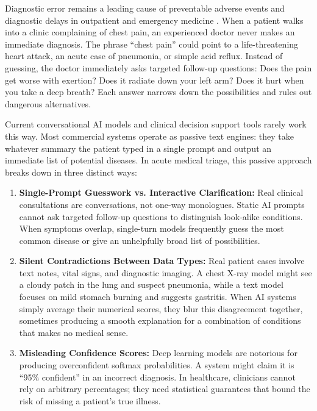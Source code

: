 \documentclass[10pt,twocolumn]{article}
\begin{document}
Diagnostic error remains a leading cause of preventable adverse events and diagnostic delays in outpatient and emergency medicine \cite{johnson2019mimic}. When a patient walks into a clinic complaining of chest pain, an experienced doctor never makes an immediate diagnosis. The phrase ``chest pain'' could point to a life-threatening heart attack, an acute case of pneumonia, or simple acid reflux. Instead of guessing, the doctor immediately asks targeted follow-up questions: Does the pain get worse with exertion? Does it radiate down your left arm? Does it hurt when you take a deep breath? Each answer narrows down the possibilities and rules out dangerous alternatives.

Current conversational AI models and clinical decision support tools rarely work this way. Most commercial systems operate as passive text engines: they take whatever summary the patient typed in a single prompt and output an immediate list of potential diseases. In acute medical triage, this passive approach breaks down in three distinct ways:

\begin{enumerate}
    \item \textbf{Single-Prompt Guesswork vs. Interactive Clarification:} Real clinical consultations are conversations, not one-way monologues. Static AI prompts cannot ask targeted follow-up questions to distinguish look-alike conditions. When symptoms overlap, single-turn models frequently guess the most common disease or give an unhelpfully broad list of possibilities.
    \item \textbf{Silent Contradictions Between Data Types:} Real patient cases involve text notes, vital signs, and diagnostic imaging. A chest X-ray model might see a cloudy patch in the lung and suspect pneumonia, while a text model focuses on mild stomach burning and suggests gastritis. When AI systems simply average their numerical scores, they blur this disagreement together, sometimes producing a smooth explanation for a combination of conditions that makes no medical sense.
    \item \textbf{Misleading Confidence Scores:} Deep learning models are notorious for producing overconfident softmax probabilities. A system might claim it is ``95\% confident'' in an incorrect diagnosis. In healthcare, clinicians cannot rely on arbitrary percentages; they need statistical guarantees that bound the risk of missing a patient's true illness.
\end{enumerate}
\end{document}
